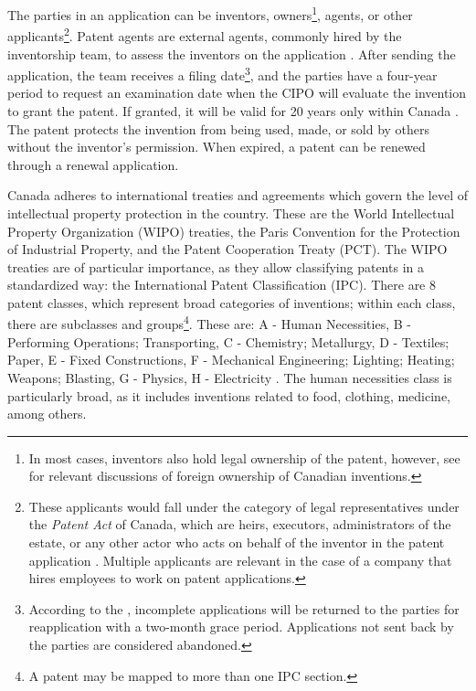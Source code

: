 \documentclass[../main.tex]{subfiles}
\begin{document}
The parties in an application can be inventors, owners\footnote{In most cases, inventors also hold legal ownership of the patent, however, see \textcite{alam_etal22, beaudry_schiffauerova11} for relevant discussions of foreign ownership of Canadian inventions.}, agents, or other applicants\footnote{These applicants would fall under the category of legal representatives under the \textit{Patent Act} of Canada, which are heirs, executors, administrators of the estate, or any other actor who acts on behalf of the inventor in the patent application \parencite{Patent85}. Multiple applicants are relevant in the case of a company that hires employees to work on patent applications.}. Patent agents are external agents, commonly hired by the inventorship team, to assess the inventors on the application \parencite{putnam06}. After sending the application, the team receives a filing date\footnote{According to the \textcite{canadianintellectualpropertyoffice21}, incomplete applications will be returned to the parties for reapplication with a two-month grace period. Applications not sent back by the parties are considered abandoned.}, and the parties have a four-year period to request an examination date when the CIPO will evaluate the invention to grant the patent. If granted, it will be valid for 20 years only within Canada \parencite{abbes_etal22}. The patent protects the invention from being used, made, or sold by others without the inventor's permission. When expired, a patent can be renewed through a renewal application. 

Canada adheres to international treaties and agreements which govern the level of intellectual property protection in the country. These are the World Intellectual Property Organization (WIPO) treaties, the Paris Convention for the Protection of Industrial Property, and the Patent Cooperation Treaty (PCT). The WIPO treaties are of particular importance, as they allow classifying patents in a standardized way: the International Patent Classification (IPC). There are 8 patent classes, which represent broad categories of inventions; within each class, there are subclasses and groups\footnote{A patent may be mapped to more than one IPC section.}. These are: A - Human Necessities, B - Performing Operations; Transporting, C - Chemistry; Metallurgy, D - Textiles; Paper, E - Fixed Constructions, F - Mechanical Engineering; Lighting; Heating; Weapons; Blasting, G - Physics, H - Electricity \parencite{worldintellectualpropertyorganization24}. The human necessities class is particularly broad, as it includes inventions related to food, clothing, medicine, among others. 
 
\end{document}
